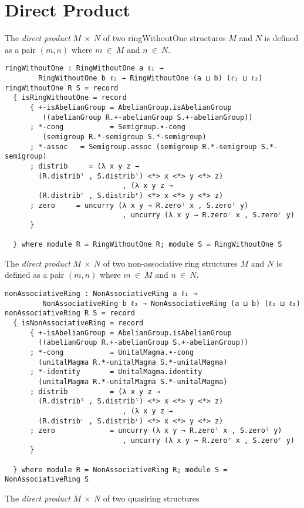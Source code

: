 \section{Direct Product}
The \textit{direct product} $M \ \times \ N$ of two ringWithoutOne structures
$M$ and $N$ is defined as a pair $(m,n)$ where $m \ \in \ M$ and $n \ \in \ N$.
\begin{verbatim}
ringWithoutOne : RingWithoutOne a ℓ₁ → 
		RingWithoutOne b ℓ₂ → RingWithoutOne (a ⊔ b) (ℓ₁ ⊔ ℓ₂)
ringWithoutOne R S = record
  { isRingWithoutOne = record
      { +-isAbelianGroup = AbelianGroup.isAbelianGroup
		 ((abelianGroup R.+-abelianGroup S.+-abelianGroup))
      ; *-cong           = Semigroup.∙-cong
		 (semigroup R.*-semigroup S.*-semigroup)
      ; *-assoc   = Semigroup.assoc (semigroup R.*-semigroup S.*-semigroup)
      ; distrib     = (λ x y z → 
		(R.distribˡ , S.distribˡ) <*> x <*> y <*> z)
                            , (λ x y z → 
		(R.distribʳ , S.distribʳ) <*> x <*> y <*> z)
      ; zero     = uncurry (λ x y → R.zeroˡ x , S.zeroˡ y)
                            , uncurry (λ x y → R.zeroʳ x , S.zeroʳ y)
      }

  } where module R = RingWithoutOne R; module S = RingWithoutOne S
\end{verbatim}
The \textit{direct product} $M \ \times \ N$ of two
non-associative ring structures $M$ and $N$ is defined as a pair $(m,n)$ where
$m \ \in \ M$ and $n \ \in \ N$.
\begin{verbatim}
nonAssociativeRing : NonAssociativeRing a ℓ₁ →
		 NonAssociativeRing b ℓ₂ → NonAssociativeRing (a ⊔ b) (ℓ₁ ⊔ ℓ₂)
nonAssociativeRing R S = record
  { isNonAssociativeRing = record
      { +-isAbelianGroup = AbelianGroup.isAbelianGroup 
		((abelianGroup R.+-abelianGroup S.+-abelianGroup))
      ; *-cong           = UnitalMagma.∙-cong 
		(unitalMagma R.*-unitalMagma S.*-unitalMagma)
      ; *-identity       = UnitalMagma.identity 
		(unitalMagma R.*-unitalMagma S.*-unitalMagma)
      ; distrib          = (λ x y z → 
		(R.distribˡ , S.distribˡ) <*> x <*> y <*> z)
                            , (λ x y z → 
		(R.distribʳ , S.distribʳ) <*> x <*> y <*> z)
      ; zero             = uncurry (λ x y → R.zeroˡ x , S.zeroˡ y)
                            , uncurry (λ x y → R.zeroʳ x , S.zeroʳ y)
      }

  } where module R = NonAssociativeRing R; module S = NonAssociativeRing S
\end{verbatim}
The \textit{direct product} $M \ \times \ N$ of two quasiring structures
